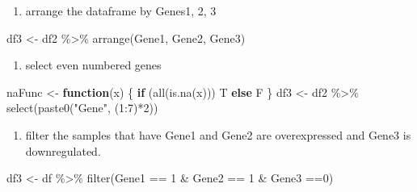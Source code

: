 \documentclass[
]{article}
\newenvironment{Shaded}{\begin{snugshade}}{\end{snugshade}}
\newcommand{\ControlFlowTok}[1]{\textcolor[rgb]{0.13,0.29,0.53}{\textbf{#1}}}
\newcommand{\DecValTok}[1]{\textcolor[rgb]{0.00,0.00,0.81}{#1}}
\newcommand{\FunctionTok}[1]{\textcolor[rgb]{0.00,0.00,0.00}{#1}}
\newcommand{\NormalTok}[1]{#1}
\newcommand{\OtherTok}[1]{\textcolor[rgb]{0.56,0.35,0.01}{#1}}
\newcommand{\SpecialCharTok}[1]{\textcolor[rgb]{0.00,0.00,0.00}{#1}}
\newcommand{\StringTok}[1]{\textcolor[rgb]{0.31,0.60,0.02}{#1}}
\providecommand{\tightlist}{%
  \setlength{\itemsep}{0pt}\setlength{\parskip}{0pt}}
\begin{document}
\begin{enumerate}
\def\labelenumi{\arabic{enumi}.}
\setcounter{enumi}{1}
\tightlist
\item
  arrange the dataframe by Genes1, 2, 3
\end{enumerate}

\begin{Shaded}
\begin{Highlighting}[]
\NormalTok{df3 }\OtherTok{\textless{}{-}}\NormalTok{ df2 }\SpecialCharTok{\%\textgreater{}\%} \FunctionTok{arrange}\NormalTok{(Gene1, Gene2, Gene3)}
\end{Highlighting}
\end{Shaded}

\begin{enumerate}
\def\labelenumi{\arabic{enumi}.}
\setcounter{enumi}{2}
\tightlist
\item
  select even numbered genes
\end{enumerate}

\begin{Shaded}
\begin{Highlighting}[]
\NormalTok{naFunc }\OtherTok{\textless{}{-}} \ControlFlowTok{function}\NormalTok{(x) \{}
    \ControlFlowTok{if}\NormalTok{ (}\FunctionTok{all}\NormalTok{(}\FunctionTok{is.na}\NormalTok{(x)))}
\NormalTok{        T}
    \ControlFlowTok{else}
\NormalTok{        F}
\NormalTok{\}}
\NormalTok{df3 }\OtherTok{\textless{}{-}}\NormalTok{ df2 }\SpecialCharTok{\%\textgreater{}\%} \FunctionTok{select}\NormalTok{(}\FunctionTok{paste0}\NormalTok{(}\StringTok{"Gene"}\NormalTok{, (}\DecValTok{1}\SpecialCharTok{:}\DecValTok{7}\NormalTok{)}\SpecialCharTok{*}\DecValTok{2}\NormalTok{))}
\end{Highlighting}
\end{Shaded}

\begin{enumerate}
\def\labelenumi{\arabic{enumi}.}
\setcounter{enumi}{3}
\tightlist
\item
  filter the samples that have Gene1 and Gene2 are overexpressed and
  Gene3 is downregulated.
\end{enumerate}

\begin{Shaded}
\begin{Highlighting}[]
\NormalTok{df3 }\OtherTok{\textless{}{-}}\NormalTok{ df }\SpecialCharTok{\%\textgreater{}\%} \FunctionTok{filter}\NormalTok{(Gene1 }\SpecialCharTok{==} \DecValTok{1} \SpecialCharTok{\&}\NormalTok{ Gene2 }\SpecialCharTok{==} \DecValTok{1} \SpecialCharTok{\&}\NormalTok{ Gene3 }\SpecialCharTok{==}\DecValTok{0}\NormalTok{)}
\end{Highlighting}
\end{Shaded}
\end{document}
